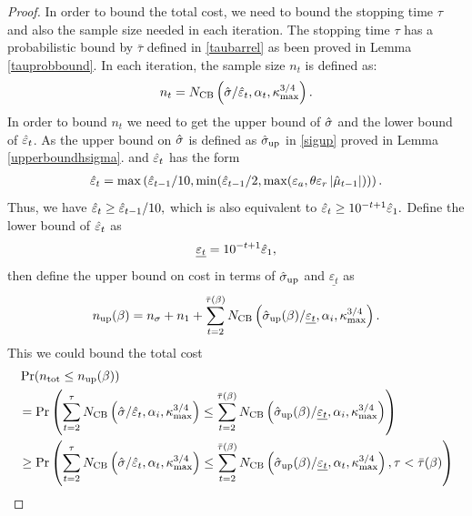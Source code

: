 \documentclass{iitthesis}
\theoremstyle{definition}
\begin{document}
\begin{proof}
 In order to bound the total cost, we need to bound the stopping time $\tau$ and also the sample size needed in each iteration. The stopping time $\tau$ has a probabilistic bound by $\bar{\tau}$ defined in \eqref{taubarrel} as been proved in Lemma \ref{tauprobbound}. In each iteration, the sample size $n_t$ is defined as:
$$n_t = N_{\text{CB}}\left(\hat{\sigma}/\hat{\varepsilon}_t,\alpha_t,\kappa_{\max}^{3/4}\right).$$
In order to bound $n_t$ we need to get the upper bound of $\hat{\sigma}$ and the lower bound of $\hat{\varepsilon}_t$. As the upper bound on $\hat{\sigma}$ is defined as $\hat{\sigma}_{\operatorname{up}}$ in \eqref{sigup} proved in Lemma \ref{upperboundhsigma}. and $\hat{\varepsilon}_t$ has the form
\begin{align*}
\hat{\varepsilon}_t= \max \left( \hat{\varepsilon}_{t-1}/10, \min(\hat{\varepsilon}_{t-1}/2, \max(\varepsilon_a,\theta\varepsilon_r\left \lvert \hat{\mu}_{t-1} \right \rvert)) \right).
\end{align*}
Thus, we have $\hat{\varepsilon}_t \geq \hat{\varepsilon}_{t-1}/10,$ which is also equivalent to $\hat{\varepsilon}_t \geq 10^{-t+1} \hat{\varepsilon}_1.$ 		Define the lower bound of $\hat{\varepsilon}_t$ as
$$\underline{\varepsilon_t} = 10^{-t+1}\hat{\varepsilon}_1,$$
then define the upper bound on cost in terms of $\hat{\sigma}_{\operatorname{up}}$ and $\underline{\varepsilon_t}$ as
\begin{equation}
n_{\operatorname{up}}(\beta) =n_\sigma+ n_1+\sum_{t=2}^{\bar{\tau}(\beta)} N_{\text{CB}}\left(\hat{\sigma}_{\operatorname{up}}(\beta)/ \underline{\varepsilon_t},\alpha_i,\kappa_{\max}^{3/4}\right).
\end{equation}
This we could bound the total cost
\begin{align*}
&\Pr(n_{\tot} \leq n_{\up}(\beta))\\
 &= \Pr\left(\sum_{t=2}^\tau  N_{\CB}\left(\hsigma/ \heps_t, \alpha_i,\kmax^{3/4}\right)  \leq \sum_{t=2}^{\bar{\tau}(\beta)} N_{\CB}\left(\hsigma_{\up}(\beta)/ \underline{\varepsilon_t},\alpha_i,\kmax^{3/4}\right) \right)\\
&\geq \Pr\left(\sum_{t=2}^\tau  N_{\CB}\left(\hsigma/ \heps_t, \alpha_t,\kmax^{3/4}\right)  \leq \sum_{t=2}^{\bar{\tau}(\beta)} N_{\CB}\left(\hsigma_{\up}(\beta)/ \underline{\varepsilon_t},\alpha_t,\kmax^{3/4}\right),\tau <\bar{\tau}(\beta) \right)\\

\end{align*}
\end{proof}
\end{document}
